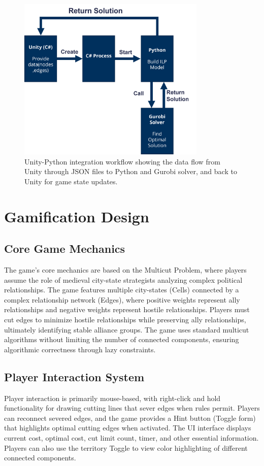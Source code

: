 \documentclass[english]{tudscrreprt}
\begin{document}
\begin{figure}[h]
\centering
\includegraphics[width=0.8\textwidth]{figures/unity_python_integration.png}
\caption{Unity-Python integration workflow showing the data flow from Unity through JSON files to Python and Gurobi solver, and back to Unity for game state updates.}
\label{fig:unity_python_integration}
\end{figure}

\section{Gamification Design}

\subsection{Core Game Mechanics}
The game's core mechanics are based on the Multicut Problem, where players assume the role of medieval city-state strategists analyzing complex political relationships. The game features multiple city-states (Cells) connected by a complex relationship network (Edges), where positive weights represent ally relationships and negative weights represent hostile relationships. Players must cut edges to minimize hostile relationships while preserving ally relationships, ultimately identifying stable alliance groups. The game uses standard multicut algorithms without limiting the number of connected components, ensuring algorithmic correctness through lazy constraints.

\subsection{Player Interaction System}
Player interaction is primarily mouse-based, with right-click and hold functionality for drawing cutting lines that sever edges when rules permit. Players can reconnect severed edges, and the game provides a Hint button (Toggle form) that highlights optimal cutting edges when activated. The UI interface displays current cost, optimal cost, cut limit count, timer, and other essential information. Players can also use the territory Toggle to view color highlighting of different connected components.
\end{document}

